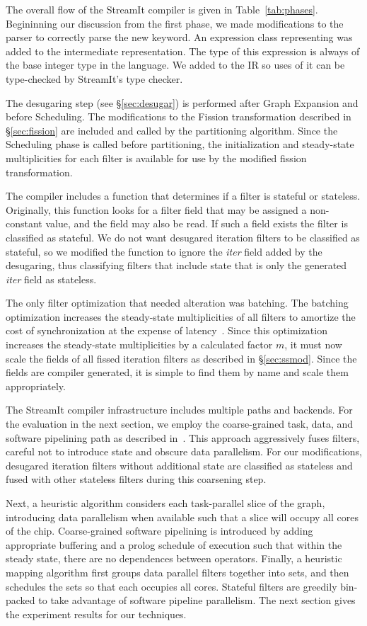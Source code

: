 The overall flow of the StreamIt compiler is given in
Table~\ref{tab:phases}.  Begininning our discussion from the first
phase, we made modifications to the parser to correctly parse the new
\iter keyword.  An expression class representing \iter was added to the
intermediate representation.  The type of this expression is always of
the base integer type in the language.  We added \iter to the IR so uses of
it can be type-checked by StreamIt's type checker.

The desugaring step (see \S\ref{sec:desugar}) is performed after Graph
Expansion and before Scheduling.  The modifications to the Fission
transformation described in \S\ref{sec:fission} are included and
called by the partitioning algorithm.  Since the Scheduling phase is
called before partitioning, the initialization and steady-state
multiplicities for each filter is available for use by the modified
fission transformation.

The compiler includes a function that determines if a filter is
stateful or stateless. Originally, this function looks for a filter
field that may be assigned a non-constant value, and the field may
also be read.  If such a field exists the filter is classified as stateful.  We
do not want desugared iteration filters to be classified as stateful,
so we modified the function to ignore the {\it iter} field added by
the desugaring, thus classifying filters that include state that is
only the generated {\it iter} field as stateless. 

The only filter optimization that needed alteration was batching.  The
batching optimization increases the steady-state multiplicities of all
filters to amortize the cost of synchronization at the expense of
latency~\cite{gordon-asplos06}.  Since this optimization increases the
steady-state multiplicities by a calculated factor $m$, it must now
scale the fields of all fissed iteration filters as described in
\S\ref{sec:ssmod}.  Since the fields are compiler generated, it is
simple to find them by name and scale them appropriately.

The StreamIt compiler infrastructure includes multiple paths and
backends.  For the evaluation in the next section, we employ the
coarse-grained task, data, and software pipelining path as described
in~\cite{gordon-asplos06}.  This approach aggressively fuses
filters, careful not to introduce state and obscure data
parallelism.  For our modifications, desugared iteration filters without
additional state are classified as stateless and fused with other stateless
filters during this coarsening step.  

Next, a heuristic algorithm considers each task-parallel slice
of the graph, introducing data parallelism when available such that a
slice will occupy all cores of the chip.  Coarse-grained software
pipelining is introduced by adding appropriate buffering and a prolog
schedule of execution such that within the steady state, there are no
dependences between operators.  Finally, a heuristic mapping algorithm
first groups data parallel filters together into sets, and then
schedules the sets so that each occupies all cores. Stateful filters
are greedily bin-packed to take advantage of software pipeline
parallelism.   The next section gives the experiment results for our
techniques.  